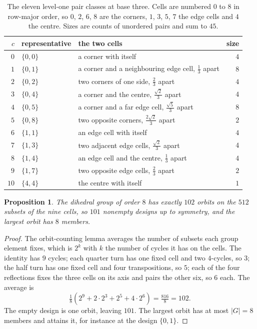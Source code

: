 \documentclass[11pt]{amsart}
\newtheorem{proposition}[theorem]{Proposition}
\theoremstyle{definition}
\theoremstyle{remark}
\begin{document}
\begin{table}[!ht]
\centering
\begin{tabular}{rllr}
\toprule
$c$ & representative & the two cells & size \\
\midrule
$0$ & $\{0,0\}$ & a corner with itself & $4$ \\
$1$ & $\{0,1\}$ & a corner and a neighbouring edge cell, $\tfrac13$ apart & $8$ \\
$2$ & $\{0,2\}$ & two corners of one side, $\tfrac23$ apart & $4$ \\
$3$ & $\{0,4\}$ & a corner and the centre, $\tfrac{\sqrt2}{3}$ apart & $4$ \\
$4$ & $\{0,5\}$ & a corner and a far edge cell, $\tfrac{\sqrt5}{3}$ apart & $8$ \\
$5$ & $\{0,8\}$ & two opposite corners, $\tfrac{2\sqrt2}{3}$ apart & $2$ \\
$6$ & $\{1,1\}$ & an edge cell with itself & $4$ \\
$7$ & $\{1,3\}$ & two adjacent edge cells, $\tfrac{\sqrt2}{3}$ apart & $4$ \\
$8$ & $\{1,4\}$ & an edge cell and the centre, $\tfrac13$ apart & $4$ \\
$9$ & $\{1,7\}$ & two opposite edge cells, $\tfrac23$ apart & $2$ \\
$10$ & $\{4,4\}$ & the centre with itself & $1$ \\
\bottomrule
\end{tabular}
\caption{The eleven level-one pair classes at base three. Cells are numbered $0$ to $8$ in row-major order, so $0$, $2$, $6$, $8$ are the corners, $1$, $3$, $5$, $7$ the edge cells and $4$ the centre. Sizes are counts of unordered pairs and sum to $45$.}
\label{tab:classes}
\end{table}

\begin{proposition}
\label{prop:orbits}
The dihedral group of order $8$ has exactly $102$ orbits on the $512$ subsets of the nine cells, so $101$ nonempty designs up to symmetry, and the largest orbit has $8$ members.
\end{proposition}

\begin{proof}
The orbit-counting lemma averages the number of subsets each group element fixes, which is $2^{k}$ with $k$ the number of cycles it has on the cells. The identity has $9$ cycles; each quarter turn has one fixed cell and two $4$-cycles, so $3$; the half turn has one fixed cell and four transpositions, so $5$; each of the four reflections fixes the three cells on its axis and pairs the other six, so $6$ each. The average is
\[
\tfrac{1}{8}\left( 2^9 + 2 \cdot 2^3 + 2^5 + 4 \cdot 2^6 \right) = \tfrac{816}{8} = 102 .
\]
The empty design is one orbit, leaving $101$. The largest orbit has at most $|G| = 8$ members and attains it, for instance at the design $\{0,1\}$.
\end{proof}
\end{document}
